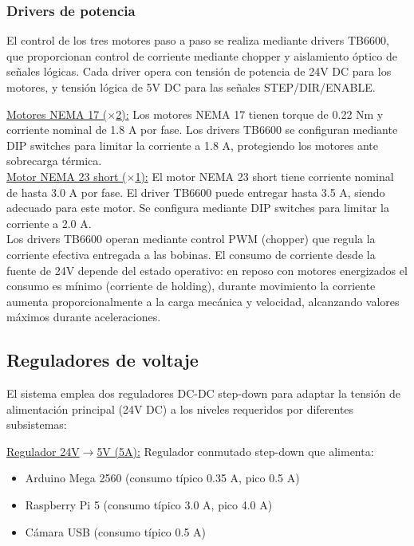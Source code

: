 \subsubsection{Drivers de potencia}
El control de los tres motores paso a paso se realiza mediante drivers TB6600, que proporcionan control de corriente mediante chopper y aislamiento óptico de señales lógicas. Cada driver opera con tensión de potencia de 24V DC para los motores, y tensión lógica de 5V DC para las señales STEP/DIR/ENABLE.

\underline{Motores NEMA 17 ($\times$2):} Los motores NEMA 17 tienen torque de 0.22 Nm y corriente nominal de 1.8 A por fase. Los drivers TB6600 se configuran mediante DIP switches para limitar la corriente a 1.8 A, protegiendo los motores ante sobrecarga térmica.\\

\underline{Motor NEMA 23 short ($\times$1):} El motor NEMA 23 short tiene corriente nominal de hasta 3.0 A por fase. El driver TB6600 puede entregar hasta 3.5 A, siendo adecuado para este motor. Se configura mediante DIP switches para limitar la corriente a 2.0 A.\\

Los drivers TB6600 operan mediante control PWM (chopper) que regula la corriente efectiva entregada a las bobinas. El consumo de corriente desde la fuente de 24V depende del estado operativo: en reposo con motores energizados el consumo es mínimo (corriente de holding), durante movimiento la corriente aumenta proporcionalmente a la carga mecánica y velocidad, alcanzando valores máximos durante aceleraciones.

\subsection{Reguladores de voltaje}

El sistema emplea dos reguladores DC-DC step-down para adaptar la tensión de alimentación principal (24V DC) a los niveles requeridos por diferentes subsistemas:

\underline{Regulador 24V$\rightarrow$5V (5A):} Regulador conmutado step-down que alimenta:
\begin{itemize}[label=$\bullet$]
\item Arduino Mega 2560 (consumo típico 0.35 A, pico 0.5 A)
\item Raspberry Pi 5 (consumo típico 3.0 A, pico 4.0 A)
\item Cámara USB (consumo típico 0.5 A)
\end{itemize}

